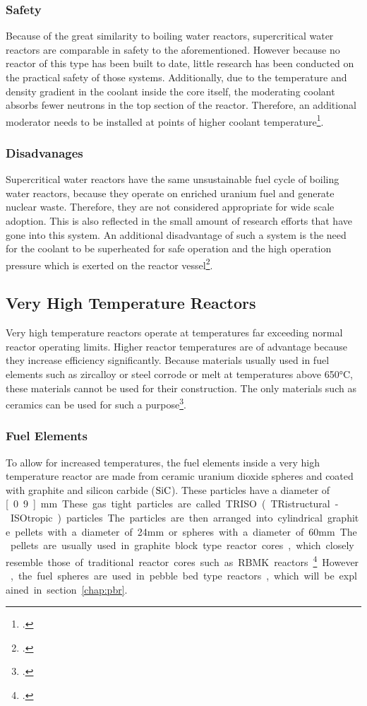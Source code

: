 \subsubsection{Safety}
Because of the great similarity to boiling water reactors, supercritical water reactors are comparable
in safety to the aforementioned. However because no reactor of this type has been built to date,
little research has been conducted on the practical safety of those systems.
Additionally, due to the temperature and density gradient in the coolant inside the core itself,
the moderating coolant absorbs fewer neutrons in the top section of the reactor. Therefore,
an additional moderator needs to be installed at points of higher coolant temperature\footcite[52-53]{T4Gen}.
\subsubsection{Disadvanages}
Supercritical water reactors have the same unsustainable fuel cycle of boiling water reactors,
because they operate on enriched uranium fuel and generate nuclear waste. Therefore, they are
not considered appropriate for wide scale adoption. This is also reflected in the small amount
of research efforts that have gone into this system.
An additional disadvantage of such a system is the need for the coolant to be superheated for
safe operation and the high operation pressure which is exerted on the reactor vessel\footcite[52-53]{T4Gen}.
\pagebreak
\subsection{Very High Temperature Reactors}
Very high temperature reactors operate at temperatures far exceeding normal reactor operating limits.
Higher reactor temperatures are of advantage because they increase efficiency significantly.
Because materials usually used in fuel elements such as zircalloy or steel corrode or melt at temperatures
above 650°C, these materials cannot be used for their construction.
The only materials such as ceramics can be used for such a purpose\footcite[55]{T4Gen}.
\subsubsection{Fuel Elements}
To allow for increased temperatures, the fuel elements inside a very high temperature reactor are made
from ceramic uranium dioxide spheres and coated with graphite and silicon carbide ($\ce{SiC}$). These
particles have a diameter of \unit[0.9]{mm}. These gas tight particles are called TRISO (TRistructural-ISOtropic) particles.
The particles are then arranged into cylindrical graphite
pellets with a diameter of 24mm or spheres with a diameter of 60mm. The pellets are usually used in
graphite block type reactor cores, which closely resemble those of traditional reactor cores such
as RBMK reactors\footcite[56]{T4Gen}. However, the fuel spheres are used in pebble bed type reactors, which will be explained
in section~\ref{chap:pbr}.
